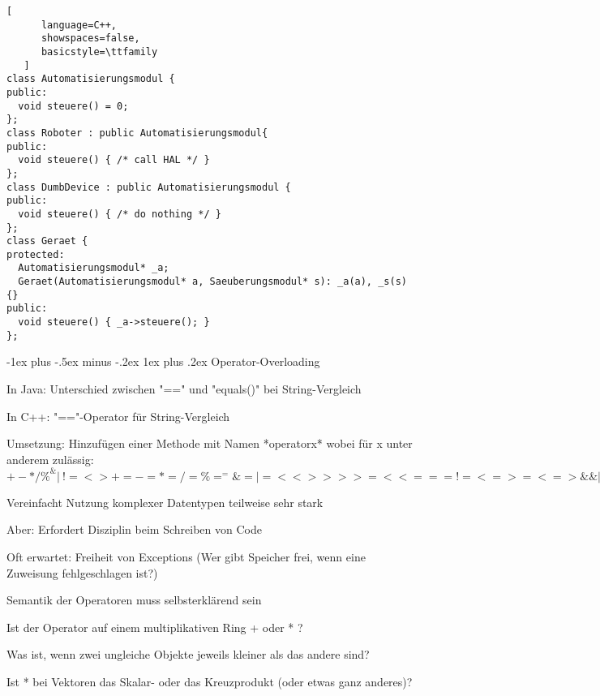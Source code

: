 \documentclass[10pt]{article}
\makeatletter
\renewcommand{\subsubsection}{\@startsection{subsubsection}{3}{0mm}%
                                {-1ex plus -.5ex minus -.2ex}%
                                {1ex plus .2ex}%
                                {\normalfont\small\bfseries}}
\makeatother
\begin{document}
\begin{lstlisting}[
      language=C++,
      showspaces=false,
      basicstyle=\ttfamily
   ]
class Automatisierungsmodul {
public:
  void steuere() = 0;
};
class Roboter : public Automatisierungsmodul{
public:
  void steuere() { /* call HAL */ }
};
class DumbDevice : public Automatisierungsmodul {
public:
  void steuere() { /* do nothing */ }
};
class Geraet {
protected:
  Automatisierungsmodul* _a;
  Geraet(Automatisierungsmodul* a, Saeuberungsmodul* s): _a(a), _s(s) {}
public:
  void steuere() { _a->steuere(); }
};
\end{lstlisting}

\subsubsection{Operator-Overloading}

\begin{itemize*}
  \item In Java: Unterschied zwischen "==" und "equals()" bei String-Vergleich
  \item In C++: "=="-Operator für String-Vergleich
  \item Umsetzung: Hinzufügen einer Methode mit Namen *operatorx* wobei für x unter anderem zulässig: $+ - * / \% ^ \& | ~ ! = < > += -= *= /= \%= ^= \&= |= << >> >>= <<= == != <= >= <=> \&\& || ++ -- , ->* -> () []$
  \item Vereinfacht Nutzung komplexer Datentypen teilweise sehr stark
  \item Aber: Erfordert Disziplin beim Schreiben von Code
  \begin{itemize*}
    \item Oft erwartet: Freiheit von Exceptions (Wer gibt Speicher frei, wenn eine Zuweisung fehlgeschlagen ist?)
    \item Semantik der Operatoren muss selbsterklärend sein
    \begin{itemize*}
      \item Ist der Operator auf einem multiplikativen Ring + oder * ?
      \item Was ist, wenn zwei ungleiche Objekte jeweils kleiner als das andere sind?
      \item Ist * bei Vektoren das Skalar- oder das Kreuzprodukt (oder etwas ganz anderes)?
    \end{itemize*}
  \end{itemize*}
\end{itemize*}
\end{document}
